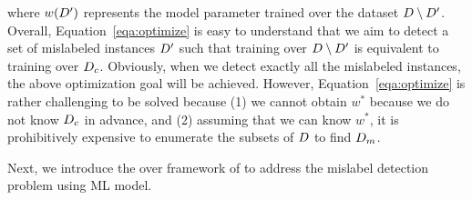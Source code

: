 \noindent where $w(D')$ represents the model parameter trained over the dataset $D \setminus D'$. Overall, Equation~\ref{eqa:optimize}
is easy to understand that we aim to detect a set of mislabeled instances $D'$ such that training over $D \setminus D'$ is equivalent to training over $D_c$. Obviously, when we detect exactly all the mislabeled instances, the above optimization goal will be achieved. However, Equation~\ref{eqa:optimize} is rather challenging to be solved because (1) we cannot obtain $w^*$ because we do not know $D_c$ in advance, and (2) assuming that we can know  $w^*$, it is prohibitively expensive to enumerate the subsets of $D$ to find $D_m$.

Next, we introduce the over framework of \sys to address the mislabel detection problem using ML model.




